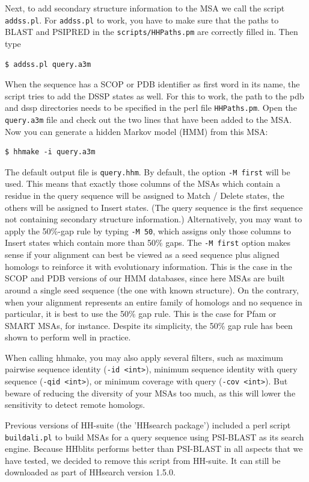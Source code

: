 \documentclass[11pt,a4paper]{article}
\begin{document}
Next, to add secondary structure information to the MSA we call the script \verb`addss.pl`. For \verb`addss.pl` to work, you have to make sure that the paths to BLAST and PSIPRED in the \verb`scripts/HHPaths.pm` are correctly filled in. Then type
\begin{verbatim}
$ addss.pl query.a3m
\end{verbatim}
When the sequence has a SCOP or PDB identifier as first word in its name, the script tries to add the DSSP states as well. For this to work, the path to the pdb and dssp directories needs to be specified in the perl file \verb`HHPaths.pm`. Open the \verb`query.a3m` file and check out the two lines that have been added to the MSA. Now you can generate a hidden Markov model (HMM) from this MSA:
\begin{verbatim}
$ hhmake -i query.a3m
\end{verbatim}
The default output file is \verb`query.hhm`. By default, the option \verb`-M first` will 
be used. This means that exactly those columns of 
the MSAs which contain a residue in the query sequence will be assigned to Match 
/ Delete states, the others will be assigned to Insert states. (The query sequence is 
the first sequence not containing secondary structure information.) Alternatively, you 
may want to apply the 50\%-gap rule by typing \verb`-M 50`, which assigns only those columns 
to Insert states which contain more than 50\% gaps. The \verb`-M first` option makes sense 
if your alignment can best be viewed as a seed sequence plus aligned homologs to 
reinforce it with evolutionary information. This is the case in the SCOP and PDB 
versions of our HMM databases, since here MSAs are built around a single seed 
sequence (the one with known structure). On the contrary, when your alignment 
represents an entire family of homologs and no sequence in particular, it is best to 
use the 50\% gap rule. This is the case for Pfam or SMART MSAs, for instance. 
Despite its simplicity, the 50\% gap rule has been shown to perform well in practice.

When calling hhmake, you may also apply several filters, such as maximum pairwise 
sequence identity (\verb`-id <int>`), minimum sequence identity with query sequence 
(\verb`-qid <int>`), or minimum coverage with query (\verb`-cov <int>`). But beware 
of reducing the diversity of your MSAs too much, as this will lower the sensitivity to
detect remote homologs.

Previous versions of HH-suite (the 'HHsearch package') included a perl script \verb`buildali.pl` to build MSAs for a query sequence using PSI-BLAST as its search engine. Because HHblits performs better than PSI-BLAST in all aspects that we have tested, we decided to remove this script from HH-suite. It can still be downloaded as part of HHsearch version 1.5.0.
\end{document}
